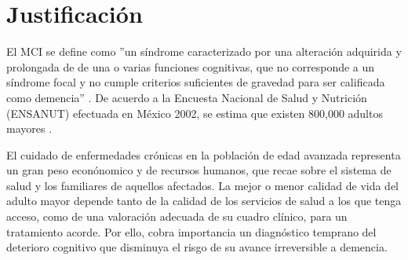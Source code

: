 

\section{Justificaci\'on}

El MCI se define como ''un s\'indrome caracterizado por una alteraci\'on adquirida y prolongada de
de una o varias funciones cognitivas, que no corresponde a un s\'indrome focal y no cumple
criterios suficientes de gravedad para ser calificada como demencia'' \cite{Robles02}.
De acuerdo a la Encuesta Nacional de Salud y Nutrici\'on (ENSANUT) efectuada en M\'exico 2002,
se estima que existen 800,000 adultos mayores \cite{Sosa12}.


El cuidado de enfermedades cr\'onicas 
en la poblaci\'on de edad avanzada representa un gran peso
econ\'onomico y de recursos humanos, que
recae sobre el sistema de salud y los familiares de aquellos afectados. 
La mejor o menor calidad 
de vida del adulto mayor depende tanto de la calidad de los servicios de salud a los que tenga
acceso, como de una valoraci\'on adecuada de su cuadro cl\'inico, para un tratamiento acorde.
Por ello, cobra importancia un diagn\'ostico temprano del deterioro cognitivo que disminuya
el risgo de su avance irreversible a demencia.



